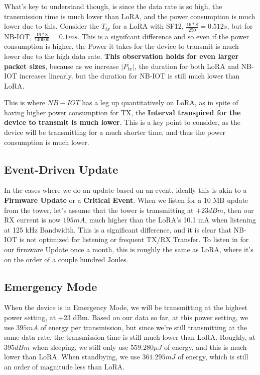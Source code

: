 What's key to understand though, is since the data rate is so high, the transmission time is much lower than LoRA, and the power consumption is much lower due to this. Consider the $T_{tx}$ for a LoRA with SF12, $\frac{16 * 8}{250} = 0.512 s$, but for NB-IOT, $\frac{16 * 8}{140000} = 0.1 ms$. This is a signifcant difference and so even if the power consumption is higher, the Power it takes for the device to transmit is much lower due to the high data rate. \textbf{This observation holds for even larger packet sizes}, because as we increase $|P_{tx}|$, the duration for both LoRA and NB-IOT increases linearly, but the duration for NB-IOT is still much lower than LoRA.

This is where $NB-IOT$ has a leg up quantitatively on LoRA, as in spite of having higher power consumption for TX, the \textbf{Interval transpired for the device to transmit is much lower}. This is a key point to consider, as the device will be transmitting for a much shorter time, and thus the power consumption is much lower.


\subsection{Event-Driven Update}
In the cases where we do an update based on an event, ideally this is akin to a \textbf{Firmware Update} or a \textbf{Critical Event}. When we listen for a 10 MB update from the tower, let's assume that the tower is transmitting at $+23 dBm$, then our RX current is now $195 mA$, much higher than the LoRA's 10.1 mA when listening at 125 kHz Bandwidth. This is a significant difference, and it is clear that NB-IOT is not optimized for listening or frequent TX/RX Transfer. To listen in for our firmware Update once a month, this is roughly the same as LoRA, where it's on the order of a couple hundred Joules. 

\subsection{Emergency Mode}
When the device is in Emergency Mode, we will be transmitting at the highest power setting, at +23 dBm. Based on our data so far, at this power setting, we use $395 mA$ of energy per transmission, but since we're still transmitting at the same data rate, the transmission time is still much lower than LoRA. Roughly, at $395 dBm$ when sleeping, we still only use $559.280 \mu J$ of energy, and this is much lower than LoRA. When standbying, we use $361.295 mJ$ of energy, which is still an order of magnitude less than LoRA. 


